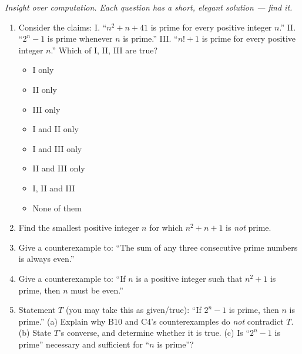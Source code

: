 \documentclass[11pt,a4paper]{article}
\begin{document}
\noindent\textit{Insight over computation. Each question has a short, elegant solution --- find it.}

\begin{enumerate}

\item Consider the claims: I. ``$n^2+n+41$ is prime for every positive integer $n$.'' II. ``$2^n-1$ is prime whenever $n$ is prime.'' III. ``$n!+1$ is prime for every positive integer $n$.'' Which of I, II, III are true?
\begin{itemize}
\item[A)] I only
\item[B)] II only
\item[C)] III only
\item[D)] I and II only
\item[E)] I and III only
\item[F)] II and III only
\item[G)] I, II and III
\item[H)] None of them
\end{itemize}

\item Find the smallest positive integer $n$ for which $n^2+n+1$ is \emph{not} prime.

\item Give a counterexample to: ``The sum of any three consecutive prime numbers is always even.''

\item Give a counterexample to: ``If $n$ is a positive integer such that $n^2+1$ is prime, then $n$ must be even.''

\item Statement $T$ (you may take this as given/true): ``If $2^n-1$ is prime, then $n$ is prime.'' (a) Explain why B10 and C4's counterexamples do \emph{not} contradict $T$. (b) State $T$'s converse, and determine whether it is true. (c) Is ``$2^n-1$ is prime'' necessary and sufficient for ``$n$ is prime''?

\end{enumerate}

\end{document}
